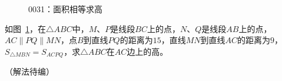 

\begin{figure}[htbp]
  \centering
  \caption{0031：面积相等求高} \label{fig:0031}
\end{figure}

如图~\ref{fig:0031}，在$\triangle ABC$中，$M$、$P$是线段$BC$上的点，$N$、$Q$是线段$AB$上的点，$AC \parallel PQ \parallel MN$，点$B$到直线$PQ$的距离为$15$，直线$MN$到直线$AC$的距离为$9$，$S_{\triangle MBN} = S_{ACPQ}$，求$\triangle ABC$在$AC$边上的高。

（解法待编）
